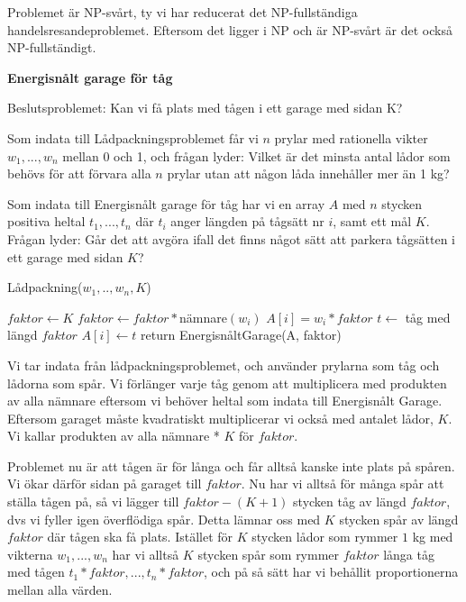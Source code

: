 \documentclass[11pt]{exam}
\begin{document}
\begin{questions}
Problemet är NP-svårt, ty vi har reducerat det NP-fullständiga handelsresandeproblemet. Eftersom det ligger i NP och är NP-svårt är det också NP-fullständigt.
\newpage

\question \textbf{Energisnålt garage för tåg}

Beslutsproblemet: Kan vi få plats med tågen i ett garage med sidan K?

Som indata till Lådpackningsproblemet får vi $n$ prylar med rationella vikter $w_1, ..., w_n$ mellan 0 och 1, och frågan lyder: Vilket är det minsta antal lådor som behövs för att förvara alla $n$ prylar utan att någon låda innehåller mer än 1 kg?

Som indata till Energisnålt garage för tåg har vi en array $A$ med $n$ stycken positiva heltal $t_1, ..., t_n$ där $t_i$ anger längden på tågsätt nr $i$, samt ett mål $K$. Frågan lyder: Går det att avgöra ifall det finns något sätt att parkera tågsätten i ett garage med sidan $K$?

\begin{algorithm}
	\caption{Lådpackning($w_1, .., w_n, K$)}
	\begin{algorithmic}
		\STATE $faktor \leftarrow K$
			\STATE $faktor \leftarrow faktor * $nämnare$(w_i)$ 
		\ENDFOR
			\STATE $A[i] = w_i * faktor$ 
		\ENDFOR
		\STATE $t \leftarrow$ tåg med längd $faktor$ 
			\STATE $A[i] \leftarrow t$
		\ENDFOR
		\STATE return EnergisnåltGarage(A, faktor)
	\end{algorithmic}
\end{algorithm}

Vi tar indata från lådpackningsproblemet, och använder prylarna som tåg och lådorna som spår. Vi förlänger varje tåg genom att multiplicera med produkten av alla nämnare eftersom vi behöver heltal som indata till Energisnålt Garage. Eftersom garaget måste kvadratiskt multiplicerar vi också med antalet lådor, $K$. Vi kallar produkten av alla nämnare * $K$ för $faktor$.

Problemet nu är att tågen är för långa och får alltså kanske inte plats på spåren. Vi ökar därför sidan på garaget till $faktor$. Nu har vi alltså för många spår att ställa tågen på, så vi lägger till $faktor - (K + 1)$ stycken tåg av längd $faktor$, dvs vi fyller igen överflödiga spår. Detta lämnar oss med $K$ stycken spår av längd $faktor$ där tågen ska få plats. Istället för $K$ stycken lådor som rymmer $1$ kg med vikterna $w_1, ..., w_n$ har vi alltså $K$ stycken spår som rymmer $faktor$ långa tåg med tågen $t_1 * faktor, ..., t_n * faktor$, och på så sätt har vi behållit proportionerna mellan alla värden.


\end{questions}
\end{document}
